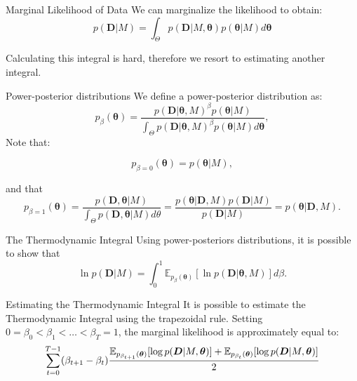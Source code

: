 \documentclass{beamer}
\newcommand{\expectation}{\mathbb{E}}
\begin{document}
\begin{frame}{Marginal Likelihood of Data}
We can marginalize the likelihood to obtain:
\begin{equation*}
    p ({\bm D} | M) = \int_{\Theta} p ({\bm D} | M, {\bm \theta}) 
    p ({\bm \theta} | M)d{\bm \theta}
\end{equation*}

\pause
Calculating this integral is hard, therefore we resort to estimating
another integral.
\end{frame}


\begin{frame}{Power-posterior distributions}
We define a power-posterior distribution as:
\begin{equation*}
    p_{\beta} ({\bm \theta}) = 
        \frac{p ({\bm D} | {\bm \theta}, M)^\beta p({\bm \theta} | M)}
                    {\int_\Theta p ({\bm D} | {\bm \theta}, M)^\beta 
                    p({\bm \theta} | M) 
                    d{\bm \theta}},
\end{equation*}
\pause
Note that:

\begin{equation*}
    p_{\beta=0} ({\bm \theta}) = p ({\bm \theta} | M),
\end{equation*}

\pause
and that
\begin{equation*}
    p_{\beta=1}({\bm \theta}) =\frac{p ({\bm D}, {\bm \theta}|M)}
                {\int_\Theta p ({\bm D}, {\bm \theta} | M)d\theta}
                 =\frac{p({\bm \theta} | {\bm D}, M) p({\bm D}|M)}
                    {p ({\bm D} | M)}
                =p ({\bm \theta} | {\bm D}, M).
\end{equation*}
\end{frame}


\begin{frame}{The Thermodynamic Integral}
Using power-posteriors distributions, it is possible to show that
\pause
\begin{equation*}
    \ln p ({\bm D} | M) = \int_0^1 \expectation_{p_\beta ({\bm \theta})} 
        [\ln p({\bm D}|{\bm \theta}, M)]d\beta.
    \label{eq:marginal_likelihood_again}
\end{equation*}
\end{frame}


\begin{frame}{Estimating the Thermodynamic Integral}
It is possible to estimate the Thermodynamic Integral using the 
trapezoidal rule. \pause Setting $0 = \beta_0 < \beta_1 < \ldots 
< \beta_T = 1$, the marginal likelihood is approximately equal to:
\pause
\begin{equation*}
    \footnotesize
    \sum_{t = 0}^{T - 1} (\beta_{t + 1} - \beta_t)
\frac{
    \expectation_{p_{\beta_{t + 1}} ({\bm \theta})}[\log p({\bm D} | M,
    {\bm \theta})]
+ 
    \expectation_{p_{\beta_{t}} ({\bm \theta})}[\log p({\bm D} | M, {\bm
    \theta})]}
{2}
\end{equation*}
\end{frame}
\end{document}
